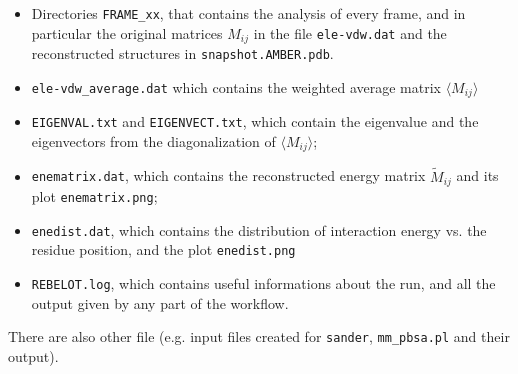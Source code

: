 \documentclass[a4paper,12pt]{book}
\begin{document}
\begin{itemize}
	\item Directories \texttt{FRAME\_xx}, that contains the analysis of every frame, and in particular the original matrices $M_{ij}$ in the file \texttt{ele-vdw.dat} and the reconstructed structures in \texttt{snapshot.AMBER.pdb}.
	\item \texttt{ele-vdw\_average.dat} which contains the weighted average matrix $\langle M_{ij} \rangle$
	\item \texttt{EIGENVAL.txt} and \texttt{EIGENVECT.txt}, which contain the eigenvalue and the eigenvectors from the diagonalization of $\langle M_{ij} \rangle$;
	\item \texttt{enematrix.dat}, which contains the reconstructed energy matrix $\tilde{M}_{ij}$ and its plot \texttt{enematrix.png};
	\item \texttt{enedist.dat}, which contains the distribution of interaction energy vs. the residue position, and the plot \texttt{enedist.png}
	\item \texttt{REBELOT.log}, which contains useful informations about the run, and all the output given by any part of the workflow.
\end{itemize}
There are also other file (e.g. input files created for \texttt{sander}, \texttt{mm\_pbsa.pl} and their output).
\end{document}
